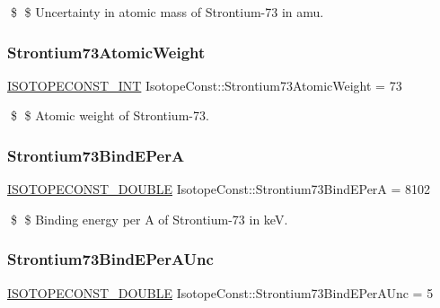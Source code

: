 \$ \$ Uncertainty in atomic mass of Strontium-\/73 in amu. \mbox{\label{group___isotope_const-_strontium-_sr73_ga1f92d649762385cb9786d6d06ed005af}} 
\subsubsection{\texorpdfstring{Strontium73\+Atomic\+Weight}{Strontium73AtomicWeight}}
{\footnotesize\ttfamily \mbox{\hyperlink{group___isotope_const-_macros_ga5f18360b3e99483a35c32d789e62621c}{I\+S\+O\+T\+O\+P\+E\+C\+O\+N\+S\+T\+\_\+\+I\+NT}} Isotope\+Const\+::\+Strontium73\+Atomic\+Weight = 73}

\$ \$ Atomic weight of Strontium-\/73. \mbox{\label{group___isotope_const-_strontium-_sr73_ga73f1195f44d098fd59ae36c19f76be61}} 
\subsubsection{\texorpdfstring{Strontium73\+Bind\+E\+PerA}{Strontium73BindEPerA}}
{\footnotesize\ttfamily \mbox{\hyperlink{group___isotope_const-_macros_ga8f45a7272ce02c0b4c65c44636ed719a}{I\+S\+O\+T\+O\+P\+E\+C\+O\+N\+S\+T\+\_\+\+D\+O\+U\+B\+LE}} Isotope\+Const\+::\+Strontium73\+Bind\+E\+PerA = 8102}

\$ \$ Binding energy per A of Strontium-\/73 in keV. \mbox{\label{group___isotope_const-_strontium-_sr73_ga4b064eb773e7517d6d48649682af0b8c}} 
\subsubsection{\texorpdfstring{Strontium73\+Bind\+E\+Per\+A\+Unc}{Strontium73BindEPerAUnc}}
{\footnotesize\ttfamily \mbox{\hyperlink{group___isotope_const-_macros_ga8f45a7272ce02c0b4c65c44636ed719a}{I\+S\+O\+T\+O\+P\+E\+C\+O\+N\+S\+T\+\_\+\+D\+O\+U\+B\+LE}} Isotope\+Const\+::\+Strontium73\+Bind\+E\+Per\+A\+Unc = 5}

